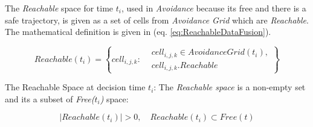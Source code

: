 \noindent The \emph{Reachable} space for time $t_i$, used in \emph{Avoidance} because its free and there is a safe trajectory, is given as a set of cells from \emph{Avoidance Grid} which are \emph{Reachable}. The mathematical definition is given in (eq. \ref{eq:ReachableDataFusion}).

\begin{equation}\label{eq:ReachableDataFusion}
    Reachable(t_i) = \left\{cell_{i,j,k}:\begin{aligned}&cell_{i,j,k}\in AvoidanceGrid(t_i),\\&cell_{i,j,k}.Reachable\end{aligned}\right\}
\end{equation}

\begin{note}{The Reachable Space at decision time $t_i$:} 
The \emph{Reachable space} is a non-empty set and its a subset of \emph{Free($t_i$)} space:    

\begin{equation}\label{eq:reachableDataFusionConstraints}
    |Reachable(t_i)| > 0, \quad Reachable(t_i) \subset Free(t)
\end{equation}
\end{note}
